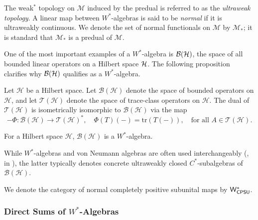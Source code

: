 \begin{definition}
  The weak\(^*\) topology on \(  \mathscr{M} \) induced by the predual is referred to as the \emph{ultraweak topology}. A linear map between \( W^* \)-algebras 
is said to be \emph{normal} if it is ultraweakly continuous.
We denote the set of normal functionals on \(  \mathscr{M} \) by \(  \mathscr{M}_* \); it is standard that \(  \mathscr{M}_* \) is a predual of \(  \mathscr{M} \).
\end{definition}

One of the most important examples of a $W^*$-algebra is $\mathcal{B}(\mathcal{H})$, the space of all bounded linear operators on a Hilbert space $\mathcal{H}$. The following proposition clarifies why \( \mathcal{B}(\mathcal{H}) \) qualifies as a \( W^* \)-algebra.

\begin{proposition} \cite[Theorem 19.2]{conwayCourseOperatorTheory2000}
  Let \(\mathcal{H}\) be a Hilbert space. Let \(\mathcal{B}(\mathcal{H}) \) denote the space of bounded operators on \(\mathcal{H}\), and let \(\mathcal{T}(\mathcal{H})\) denote the space of trace-class operators on \(\mathcal{H}\).
    The dual of \(\mathcal{T}(\mathcal{H})\) is isometrically isomorphic to \(\mathcal{B}(\mathcal{H})\) via the map
    \[
    -\Phi : \mathcal{B}(\mathcal{H}) \to \mathcal{T}(\mathcal{H})^*, \quad \Phi(T)(-) = \mathrm{tr}(T(-)), \quad \text{for all } A \in \mathcal{T}(\mathcal{H}).
    \]
\end{proposition}

\begin{example}
   For a Hilbert space $\mathcal{H}$, $\mathcal{B}(\mathcal{H})$ is a $W^*$-algebra. 
\end{example}

\begin{remark}
  While $W^*$-algebras and von Neumann algebras are often used interchangeably (\eg, in \cite{westerbaanCategoryNeumannAlgebras2019}), the latter typically denotes concrete ultraweakly closed $C^*$-subalgebras of $\mathcal{B}(\mathcal{H})$.
\end{remark}

\begin{definition}
  We denote the category of normal completely positive subunital maps by $\mathsf{W^*_{CPSU}}$.
\end{definition}

\subsubsection{Direct Sums of $W^*$-Algebras}

